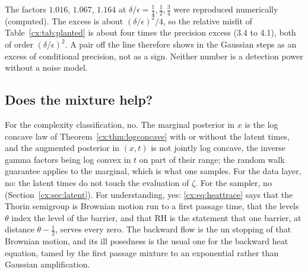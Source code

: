 The factors $1.016$, $1.067$, $1.164$ at $\delta/\epsilon=\tfrac14,\tfrac12,\tfrac34$ were reproduced numerically (computed). The excess is about $(\delta/\epsilon)^2/4$, so the relative misfit of Table~\ref{cx:tab:planted} is about four times the precision excess (3.4 to 4.1), both of order $(\delta/\epsilon)^2$. A pair off the line therefore shows in the Gaussian steps as an excess of conditional precision, not as a sign. Neither number is a detection power without a noise model.

\subsection{Does the mixture help?}

For the complexity classification, no. The marginal posterior in $x$ is the log concave law of Theorem~\ref{cx:thm:logconcave} with or without the latent times, and the augmented posterior in $(x,t)$ is not jointly log concave, the inverse gamma factors being log convex in $t$ on part of their range; the random walk guarantee applies to the marginal, which is what one samples. For the data layer, no: the latent times do not touch the evaluation of $\zeta$. For the sampler, no (Section~\ref{cx:sec:latent}). For understanding, yes: \eqref{cx:eq:heattrace} says that the Thorin semigroup is Brownian motion run to a first passage time, that the levels $\theta$ index the level of the barrier, and that RH is the statement that one barrier, at distance $\theta-\tfrac12$, serves every zero. The backward flow is the un stopping of that Brownian motion, and its ill posedness is the usual one for the backward heat equation, tamed by the first passage mixture to an exponential rather than Gaussian amplification.
